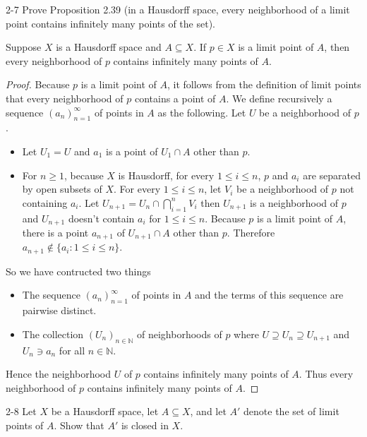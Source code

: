 \begin{problem}{2-7}
Prove Proposition 2.39 (in a Hausdorff space, every neighborhood of a limit point contains infinitely many points of the set).

Suppose $X$ is a Hausdorff space and $A\subseteq X$. If $p\in X$ is a limit point of $A$, then every neighborhood of $p$ contains infinitely many points of $A$.
\end{problem}

\begin{proof}
	Because $p$ is a limit point of $A$, it follows from the definition of limit points that every neighborhood of $p$ contains a point of $A$. We define recursively a sequence ${(a_{n})}^{\infty}_{n=1}$ of points in $A$ as the following. Let $U$ be a neighborhood of $p$.

	\begin{itemize}
		\item Let $U_{1} = U$ and $a_{1}$ is a point of $U_{1}\cap A$ other than $p$.
		\item For $n\geq 1$, because $X$ is Hausdorff, for every $1\leq i\leq n$, $p$ and $a_{i}$ are separated by open subsets of $X$. For every $1\leq i\leq n$, let $V_{i}$ be a neighborhood of $p$ not containing $a_{i}$. Let $U_{n+1} = U_{n}\cap\bigcap^{n}_{i=1}V_{i}$ then $U_{n+1}$ is a neighborhood of $p$ and $U_{n+1}$ doesn't contain $a_{i}$ for $1\leq i\leq n$. Because $p$ is a limit point of $A$, there is a point $a_{n+1}$ of $U_{n+1}\cap A$ other than $p$. Therefore $a_{n+1}\notin\{ a_{i}: 1\leq i\leq n \}$.
	\end{itemize}

	So we have contructed two things
	\begin{itemize}
		\item The sequence ${(a_{n})}^{\infty}_{n=1}$ of points in $A$ and the terms of this sequence are pairwise distinct.
		\item The collection ${(U_{n})}_{n\in\mathbb{N}}$ of neighborhoods of $p$ where $U\supseteq U_{n}\supseteq U_{n+1}$ and $U_{n}\ni a_{n}$ for all $n\in\mathbb{N}$.
	\end{itemize}

	Hence the neighborhood $U$ of $p$ contains infinitely many points of $A$. Thus every neighborhood of $p$ contains infinitely many points of $A$.
\end{proof}

\begin{problem}{2-8}
Let $X$ be a Hausdorff space, let $A\subseteq X$, and let $A'$ denote the set of limit points of $A$. Show that $A'$ is closed in $X$.
\end{problem}

